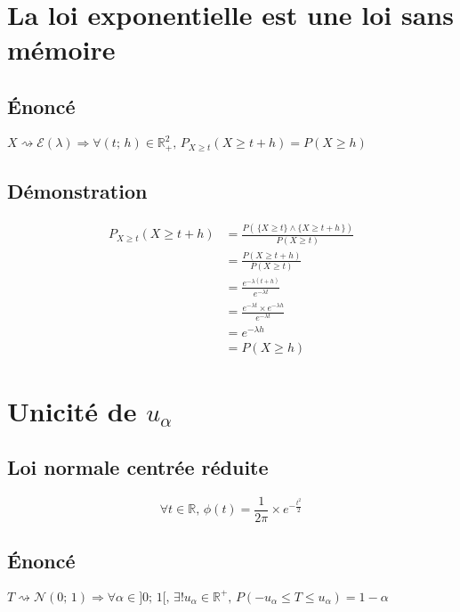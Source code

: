 \documentclass[12px]{article}
\begin{document}
	\section{La loi exponentielle est une loi sans mémoire}
	
	\subsection{\'Enoncé}
	$X\rightsquigarrow\mathcal{E}(\lambda) \Rightarrow \forall (t;\, h)\in\mathbb{R}_+^2,
	\,P_{X\geq t}(X\geq t+h) = P(X\geq h)$
	
	\subsection{Démonstration}
	\begin{align*}
	P_{X\geq t}(X\geq t+h) &= \frac{ P(\,\{X\geq t\} \wedge \{X\geq t+h\,\} ) }{P(X\geq t)}\\
	&= \frac{P(X\geq t+h)}{P(X\geq t)}\\
	&= \frac{ e^{-\lambda (t+h)} }{ e^{-\lambda t} }\\
	&= \frac{ e^{-\lambda t}\times e^{-\lambda h} }{ e^{-\lambda t} }\\
	&= e^{-\lambda h}\\
	&= P(X\geq h)
	\end{align*}
	
	\section{Unicité de $u_\alpha$}
	
	\subsection{Loi normale centrée réduite}
	\begin{displaymath}
		\forall t\in\mathbb{R},\, \phi (t) = \frac{1}{2\pi}\times e^{ -\frac{t^2}{2} }
	\end{displaymath}
	
	\newpage
	\subsection{\'Enoncé}
	$T\rightsquigarrow\mathcal{N}(0;\, 1)\Rightarrow
	\forall \alpha\in ]0;\, 1[,\, \exists ! u_\alpha\in\mathbb{R}^+,\, P(-u_\alpha\leq T\leq
	u_\alpha) = 1 - \alpha$\\
	
\end{document}
